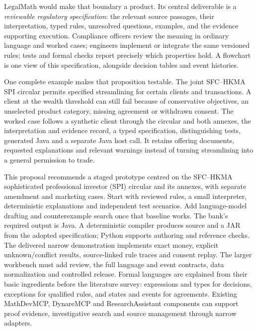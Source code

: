 \documentclass[11pt,a4paper]{article}
\begin{document}
LegalMath would make that boundary a product. Its central deliverable is a
\emph{reviewable regulatory specification}: the relevant source passages, their
interpretation, typed rules, unresolved questions, examples, and the evidence
supporting execution. Compliance officers review the meaning in ordinary language
and worked cases; engineers implement or integrate the same versioned rules; tests
and formal checks report precisely which properties hold. A flowchart is one view
of this specification, alongside decision tables and event histories.

One complete example makes that proposition testable. The joint SFC--HKMA SPI
circular permits specified streamlining for certain clients and transactions.
A client at the wealth threshold can still fail because of conservative
objectives, an unselected product category, missing agreement or withdrawn
consent. The worked case follows a synthetic client through the circular and
both annexes, the interpretation and evidence record, a typed specification,
distinguishing tests, generated Java and a separate Java host call. It retains
offering documents, requested explanations and relevant warnings instead of
turning streamlining into a general permission to trade.

This proposal recommends a staged prototype centred on the SFC--HKMA sophisticated
professional investor (SPI) circular and its annexes, with separate amendment and
marketing cases. Start with reviewed rules, a small interpreter, deterministic
explanations and independent test scenarios. Add language-model drafting and
counterexample search once that baseline works. The bank's required output is
Java. A deterministic compiler produces source and a JAR from the adopted
specification; Python supports authoring and reference checks. The delivered
narrow demonstration implements exact money, explicit unknown/conflict results,
source-linked rule traces and consent replay. The larger workbench must add
review, the full language and event contracts, data normalization and controlled
release. Formal languages are explained from their basic ingredients before
the literature survey: expressions and types for decisions, exceptions for
qualified rules, and states and events for agreements.
Existing MathDevMCP, DynareMCP and ResearchAssistant components can support proof
evidence, investigative search and source management through narrow adapters.
\end{document}
